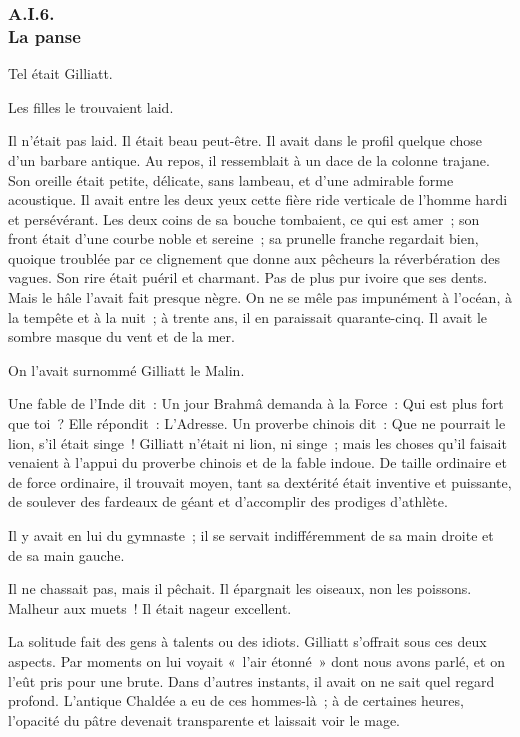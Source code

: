 \documentclass[french,twoside]{book} %
\begin{document}
 \subsubsection[{A.I.6. La panse}]{A.I.6. \\
La panse}
\noindent Tel était Gilliatt.\par
Les filles le trouvaient laid.\par
Il n’était pas laid. Il était beau peut-être. Il avait dans le profil quelque chose d’un barbare antique. Au repos, il ressemblait à un dace de la colonne trajane. Son oreille était petite, délicate, sans lambeau, et d’une admirable forme acoustique. Il avait entre les deux yeux cette fière ride verticale de l’homme hardi et persévérant. Les deux coins de sa bouche tombaient, ce qui est amer ; son front était d’une courbe noble et sereine ; sa prunelle franche regardait bien, quoique troublée par ce clignement que donne aux pêcheurs la réverbération des vagues. Son rire était puéril et charmant. Pas de plus pur ivoire que ses dents. Mais le hâle l’avait fait presque nègre. On ne se mêle pas impunément à l’océan, à la tempête et à la nuit ; à trente ans, il en paraissait quarante-cinq. Il avait le sombre masque du vent et de la mer.\par
 On l’avait surnommé Gilliatt le Malin.\par
Une fable de l’Inde dit : Un jour Brahmâ demanda à la Force : Qui est plus fort que toi ? Elle répondit : L’Adresse. Un proverbe chinois dit : Que ne pourrait le lion, s’il était singe ! Gilliatt n’était ni lion, ni singe ; mais les choses qu’il faisait venaient à l’appui du proverbe chinois et de la fable indoue. De taille ordinaire et de force ordinaire, il trouvait moyen, tant sa dextérité était inventive et puissante, de soulever des fardeaux de géant et d’accomplir des prodiges d’athlète.\par
Il y avait en lui du gymnaste ; il se servait indifféremment de sa main droite et de sa main gauche.\par
Il ne chassait pas, mais il pêchait. Il épargnait les oiseaux, non les poissons. Malheur aux muets ! Il était nageur excellent.\par
La solitude fait des gens à talents ou des idiots. Gilliatt s’offrait sous ces deux aspects. Par moments on lui voyait « l’air étonné » dont nous avons parlé, et on l’eût pris pour une brute. Dans d’autres instants, il avait on ne sait quel regard profond. L’antique Chaldée a eu de ces hommes-là ; à de certaines heures, l’opacité du pâtre devenait transparente et laissait voir le mage.\par
\end{document}
